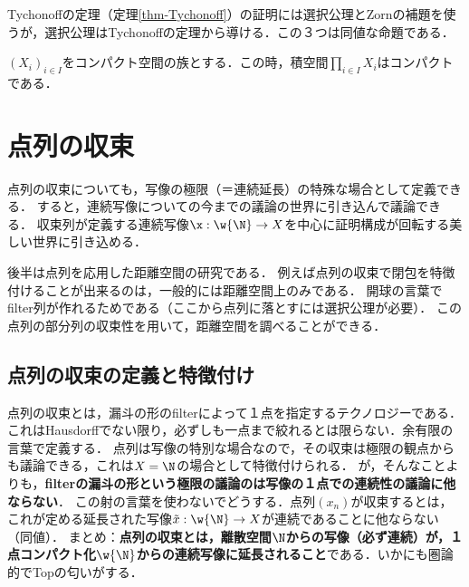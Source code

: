\documentclass[uplatex,dvipdfmx]{jsreport}
\begin{document}
\begin{remark}
    Tychonoffの定理（定理\ref{thm-Tychonoff}）の証明には選択公理とZornの補題を使うが，選択公理はTychonoffの定理から導ける．この３つは同値な命題である．
\end{remark}

\begin{theorem*}[Tychonoff]
    $(X_i)_{i\in I}$をコンパクト空間の族とする．この時，積空間$\prod_{i\in I}X_i$はコンパクトである．
\end{theorem*}

\section{点列の収束}

\begin{tcolorbox}[colframe=ForestGreen, colback=ForestGreen!10!white, breakable ,colbacktitle=ForestGreen!40!white, coltitle=black,fonttitle=\bfseries\sffamily
    ,title=点列の極限]
    点列の収束についても，写像の極限（＝連続延長）の特殊な場合として定義できる．
    すると，連続写像についての今までの議論の世界に引き込んで議論できる．
    収束列が定義する連続写像$\x:\w{\N}\to X$を中心に証明構成が回転する美しい世界に引き込める．
    
    後半は点列を応用した距離空間の研究である．
    例えば点列の収束で閉包を特徴付けることが出来るのは，一般的には距離空間上のみである．
    開球の言葉でfilter列が作れるためである（ここから点列に落とすには選択公理が必要）．
    この点列の部分列の収束性を用いて，距離空間を調べることができる．
\end{tcolorbox}

\subsection{点列の収束の定義と特徴付け}

\begin{tcolorbox}[colframe=ForestGreen, colback=ForestGreen!10!white, breakable ,colbacktitle=ForestGreen!40!white, coltitle=black,fonttitle=\bfseries\sffamily
    ,title=点列の収束の議論は，延長された写像の連続性に落とす．]
    点列の収束とは，漏斗の形のfilterによって１点を指定するテクノロジーである．これはHausdorffでない限り，必ずしも一点まで絞れるとは限らない．余有限の言葉で定義する．
    点列は写像の特別な場合なので，その収束は極限の観点からも議論できる，これは$X=\N$の場合として特徴付けられる．
    が，そんなことよりも，\textbf{filterの漏斗の形という極限の議論のは写像の１点での連続性の議論に他ならない}．
    この射の言葉を使わないでどうする．点列$(x_n)$が収束するとは，これが定める延長された写像$\tilde{x}:\w{\N}\to X$が連続であることに他ならない（同値）．
    まとめ：\textbf{点列の収束とは，離散空間$\N$からの写像（必ず連続）が，１点コンパクト化$\w{\N}$からの連続写像に延長されること}である．いかにも圏論的でTopの匂いがする．
\end{tcolorbox}
\end{document}
